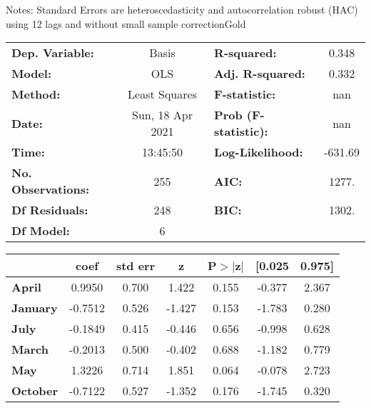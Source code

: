 Notes: \newline
 [1] Standard Errors are heteroscedasticity and autocorrelation robust (HAC) using 12 lags and without small sample correctionGold\begin{center}
\begin{tabular}{lclc}
\toprule
\textbf{Dep. Variable:}    &      Basis       & \textbf{  R-squared:         } &     0.348   \\
\textbf{Model:}            &       OLS        & \textbf{  Adj. R-squared:    } &     0.332   \\
\textbf{Method:}           &  Least Squares   & \textbf{  F-statistic:       } &       nan   \\
\textbf{Date:}             & Sun, 18 Apr 2021 & \textbf{  Prob (F-statistic):} &      nan    \\
\textbf{Time:}             &     13:45:50     & \textbf{  Log-Likelihood:    } &   -631.69   \\
\textbf{No. Observations:} &         255      & \textbf{  AIC:               } &     1277.   \\
\textbf{Df Residuals:}     &         248      & \textbf{  BIC:               } &     1302.   \\
\textbf{Df Model:}         &           6      & \textbf{                     } &             \\
\bottomrule
\end{tabular}
\begin{tabular}{lcccccc}
                 & \textbf{coef} & \textbf{std err} & \textbf{z} & \textbf{P$> |$z$|$} & \textbf{[0.025} & \textbf{0.975]}  \\
\midrule
\textbf{April}   &       0.9950  &        0.700     &     1.422  &         0.155        &       -0.377    &        2.367     \\
\textbf{January} &      -0.7512  &        0.526     &    -1.427  &         0.153        &       -1.783    &        0.280     \\
\textbf{July}    &      -0.1849  &        0.415     &    -0.446  &         0.656        &       -0.998    &        0.628     \\
\textbf{March}   &      -0.2013  &        0.500     &    -0.402  &         0.688        &       -1.182    &        0.779     \\
\textbf{May}     &       1.3226  &        0.714     &     1.851  &         0.064        &       -0.078    &        2.723     \\
\textbf{October} &      -0.7122  &        0.527     &    -1.352  &         0.176        &       -1.745    &        0.320     \\

\end{tabular}
\end{center}
